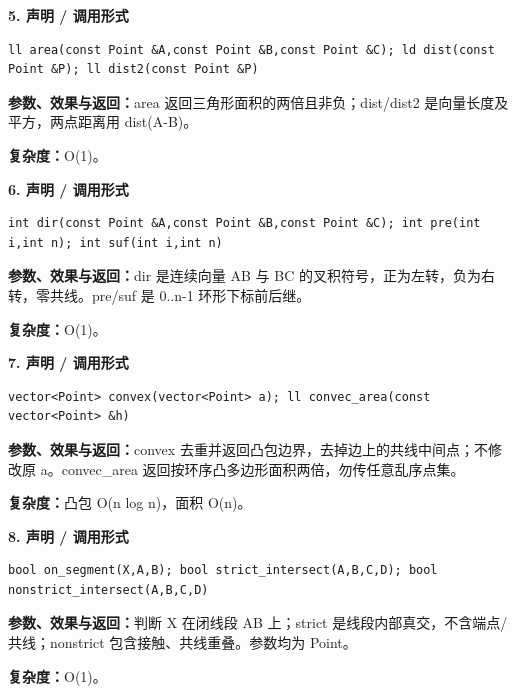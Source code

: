 \documentclass[UTF8,a4paper,10pt]{ctexart}
\begin{document}
\noindent\begin{minipage}{\textwidth}
\textbf{5. 声明 / 调用形式}
\begin{lstlisting}
ll area(const Point &A,const Point &B,const Point &C); ld dist(const Point &P); ll dist2(const Point &P)
\end{lstlisting}
\textbf{参数、效果与返回：}area 返回三角形面积的两倍且非负；dist/dist2 是向量长度及平方，两点距离用 dist(A-B)。

\textbf{复杂度：}O(1)。

\end{minipage}\par\vspace{0.4em}
\noindent\begin{minipage}{\textwidth}
\textbf{6. 声明 / 调用形式}
\begin{lstlisting}
int dir(const Point &A,const Point &B,const Point &C); int pre(int i,int n); int suf(int i,int n)
\end{lstlisting}
\textbf{参数、效果与返回：}dir 是连续向量 AB 与 BC 的叉积符号，正为左转，负为右转，零共线。pre/suf 是 0..n-1 环形下标前后继。

\textbf{复杂度：}O(1)。

\end{minipage}\par\vspace{0.4em}
\noindent\begin{minipage}{\textwidth}
\textbf{7. 声明 / 调用形式}
\begin{lstlisting}
vector<Point> convex(vector<Point> a); ll convec_area(const vector<Point> &h)
\end{lstlisting}
\textbf{参数、效果与返回：}convex 去重并返回凸包边界，去掉边上的共线中间点；不修改原 a。convec\_area 返回按环序凸多边形面积两倍，勿传任意乱序点集。

\textbf{复杂度：}凸包 O(n log n)，面积 O(n)。

\end{minipage}\par\vspace{0.4em}
\noindent\begin{minipage}{\textwidth}
\textbf{8. 声明 / 调用形式}
\begin{lstlisting}
bool on_segment(X,A,B); bool strict_intersect(A,B,C,D); bool nonstrict_intersect(A,B,C,D)
\end{lstlisting}
\textbf{参数、效果与返回：}判断 X 在闭线段 AB 上；strict 是线段内部真交，不含端点/共线；nonstrict 包含接触、共线重叠。参数均为 Point。

\textbf{复杂度：}O(1)。

\end{minipage}\par\vspace{0.4em}
\end{document}
